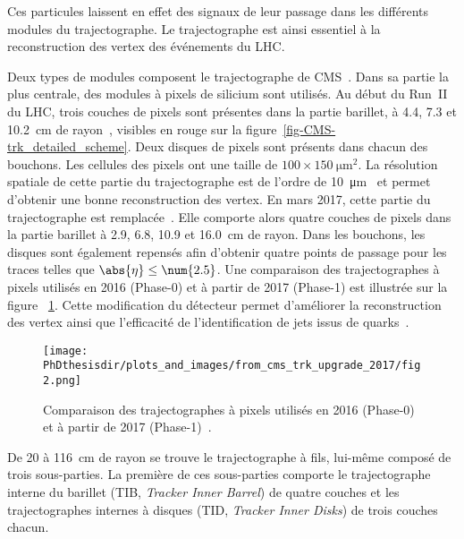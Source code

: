 Ces particules laissent en effet des signaux de leur passage dans les différents modules du trajectographe.
Le trajectographe est ainsi essentiel à la reconstruction des vertex des événements du LHC.
\par Deux types de modules composent le trajectographe de CMS~\cite{cms_paper,CERN-LHCC-98-006,CMS-TDR-11,CMS-TRK-11-001,CMS-TRK-17-001}.
Dans sa partie la plus centrale, des modules à pixels de silicium sont utilisés.
Au début du Run~II du LHC, trois couches de pixels sont présentes dans la partie barillet, à \num{4.4}, \num{7.3} et \SI{10.2}{\centi\meter} de rayon~\cite{cms_paper}, visibles en rouge sur la figure~\ref{fig-CMS-trk_detailed_scheme}.
Deux disques de pixels sont présents dans chacun des bouchons.
Les cellules des pixels ont une taille de $\num{100}\times\SI{150}{\micro\meter^2}$.
La résolution spatiale de cette partie du trajectographe est de l'ordre de \SI{10}{\micro\meter}~\cite{cms_paper} et permet d'obtenir une bonne reconstruction des vertex.
En mars 2017, cette partie du trajectographe est remplacée~\cite{CMS-TDR-11,cms_trk_upgrade_2017}.
Elle comporte alors quatre couches de pixels dans la partie barillet à \num{2.9}, \num{6.8}, \num{10.9} et \SI{16.0}{\centi\meter} de rayon.
Dans les bouchons, les disques sont également repensés afin d'obtenir quatre points de passage pour les traces telles que $\abs{\eta}\leq\num{2.5}$.
Une comparaison des trajectographes à pixels utilisés en 2016 (Phase-0) et à partir de 2017 (Phase-1) est illustrée sur la figure ~\ref{fig-chapter-LHC-section-CMS-subsec-tracker-2017-upgrade}.
Cette modification du détecteur permet d'améliorer la reconstruction des vertex ainsi que l'efficacité de l'identification de jets issus de quarks~\quarkb.
\begin{figure}[t]
\centering
\texttt{[image: \\PhDthesisdir/plots\_and\_images/from\_cms\_trk\_upgrade\_2017/fig2.png]}
\caption[Comparaison des trajectographes à pixels utilisés en 2016 et à partir de 2017.]{Comparaison des trajectographes à pixels utilisés en 2016 (Phase-0) et à partir de 2017 (Phase-1)~\cite{CMS-TDR-11,cms_trk_upgrade_2017}.}
\label{fig-chapter-LHC-section-CMS-subsec-tracker-2017-upgrade}
\end{figure}
\par De \num{20} à \SI{116}{\centi\meter} de rayon se trouve le trajectographe à fils, lui-même composé de trois sous-parties.
La première de ces sous-parties comporte le trajectographe interne du barillet (TIB, \emph{Tracker Inner Barrel}) de quatre couches et les trajectographes internes à disques (TID, \emph{Tracker Inner Disks}) de trois couches chacun.
